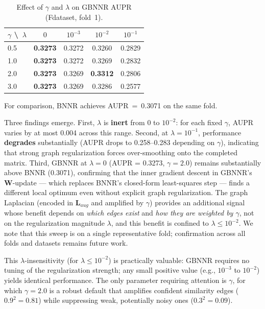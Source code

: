 \documentclass[unnumsec,webpdf,contemporary,large]{oup-authoring-template}
\begin{document}
\begin{table}[t]
\centering
\caption{Effect of $\gamma$ and $\lambda$ on GBNNR AUPR (Fdataset, fold~1).}
\label{tab:lambda_sweep}
\begin{tabular}{l c c c c}
\toprule
$\gamma$ \textbackslash\ $\lambda$ & $0$ & $10^{-3}$ & $10^{-2}$ & $10^{-1}$ \\
\midrule
0.5 & \textbf{0.3273} & 0.3272 & 0.3260 & 0.2829 \\
1.0 & \textbf{0.3273} & 0.3272 & 0.3269 & 0.2832 \\
2.0 & \textbf{0.3273} & 0.3269 & \textbf{0.3312} & 0.2806 \\
3.0 & \textbf{0.3273} & 0.3269 & 0.3286 & 0.2577 \\
\bottomrule
\end{tabular}
\end{table}

For comparison, BNNR achieves AUPR~=~0.3071 on the same fold.

Three findings emerge. First, $\lambda$ is \textbf{inert} from $0$ to $10^{-2}$: for each fixed $\gamma$, AUPR varies by at most 0.004 across this range. Second, at $\lambda = 10^{-1}$, performance \textbf{degrades} substantially (AUPR drops to 0.258--0.283 depending on $\gamma$), indicating that strong graph regularization forces over-smoothing onto the completed matrix. Third, GBNNR at $\lambda = 0$ (AUPR = 0.3273, $\gamma = 2.0$) remains substantially above BNNR (0.3071), confirming that the inner gradient descent in GBNNR's $\mathbf{W}$-update --- which replaces BNNR's closed-form least-squares step --- finds a different local optimum even without explicit graph regularization. The graph Laplacian (encoded in $\mathbf{L}_{aug}$ and amplified by $\gamma$) provides an additional signal whose benefit depends on \textit{which edges exist} and \textit{how they are weighted by $\gamma$}, not on the regularization magnitude $\lambda$, and this benefit is confined to $\lambda \leq 10^{-2}$. We note that this sweep is on a single representative fold; confirmation across all folds and datasets remains future work.

This $\lambda$-insensitivity (for $\lambda \leq 10^{-2}$) is practically valuable: GBNNR requires no tuning of the regularization strength; any small positive value (e.g., $10^{-3}$ to $10^{-2}$) yields identical performance. The only parameter requiring attention is $\gamma$, for which $\gamma = 2.0$ is a robust default that amplifies confident similarity edges ($0.9^2 = 0.81$) while suppressing weak, potentially noisy ones ($0.3^2 = 0.09$).
\end{document}
